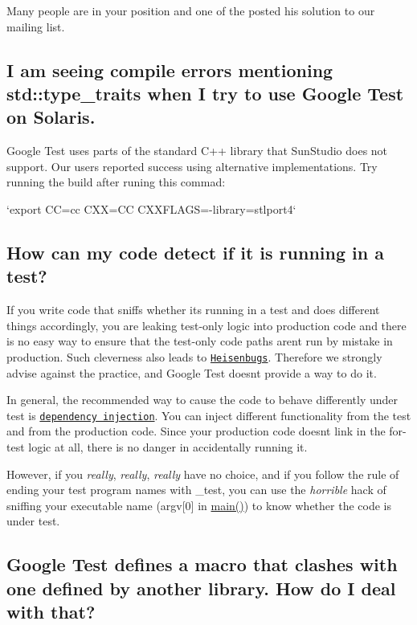 Many people are in your position and one of the posted his solution to our mailing list.

\subsection*{I am seeing compile errors mentioning std\+::type\+\_\+traits when I try to use Google Test on Solaris.}

Google Test uses parts of the standard C++ library that Sun\+Studio does not support. Our users reported success using alternative implementations. Try running the build after runing this commad\+:

`export CC=cc C\+XX=CC C\+X\+X\+F\+L\+A\+GS=\textquotesingle{}-\/library=stlport4\textquotesingle{}`

\subsection*{How can my code detect if it is running in a test?}

If you write code that sniffs whether it\textquotesingle{}s running in a test and does different things accordingly, you are leaking test-\/only logic into production code and there is no easy way to ensure that the test-\/only code paths aren\textquotesingle{}t run by mistake in production. Such cleverness also leads to \href{http://en.wikipedia.org/wiki/Unusual_software_bug#Heisenbug}{\tt Heisenbugs}. Therefore we strongly advise against the practice, and Google Test doesn\textquotesingle{}t provide a way to do it.

In general, the recommended way to cause the code to behave differently under test is \href{http://jamesshore.com/Blog/Dependency-Injection-Demystified.html}{\tt dependency injection}. You can inject different functionality from the test and from the production code. Since your production code doesn\textquotesingle{}t link in the for-\/test logic at all, there is no danger in accidentally running it.

However, if you {\itshape really}, {\itshape really}, {\itshape really} have no choice, and if you follow the rule of ending your test program names with {\ttfamily \+\_\+test}, you can use the {\itshape horrible} hack of sniffing your executable name ({\ttfamily argv\mbox{[}0\mbox{]}} in {\ttfamily \hyperlink{app_2main_8cpp_ae66f6b31b5ad750f1fe042a706a4e3d4}{main()}}) to know whether the code is under test.

\subsection*{Google Test defines a macro that clashes with one defined by another library. How do I deal with that?}

